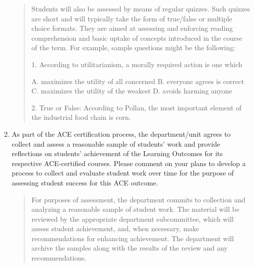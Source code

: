 \documentclass[11pt]{article}
\begin{document}
\begin{enumerate}
\begin{quote}
Students will also be assessed by means of regular quizzes. Such quizzes are
short and will typically take the form of true/false or multiple choice formats.
They are aimed at assessing and enforcing reading comprehension and basic uptake
of concepts introduced in the course of the term. For example, sample questions
might be the following:

1. According to utilitarianism, a morally required action is one which

A. maximizes the utility of all concerned
B. everyone agrees is correct
C. maximizes the utility of the weakest
D. avoids harming anyone  

2. True or False: According to Pollan, the most important element of the
industrial food chain is corn. 

\end{quote}

\item As part of the ACE certification process, the department/unit agrees to collect and assess a reasonable sample of students’ work and provide reflections on students’ achievement of the Learning Outcomes for its respective ACE-certified courses. Please comment on your plans to develop a process to collect and evaluate student work over time for the purpose of assessing student success for this ACE outcome.

\begin{quote}
For purposes of assessment, the department commits to collection and analyzing a reasonable sample of student work. The material will be reviewed by the appropriate department subcommittee, which will assess student achievement, and, when necessary, make recommendations for enhancing achievement. The department will archive the samples along with the results of the review and any recommendations.
\end{quote}
\end{enumerate}
\end{document}
